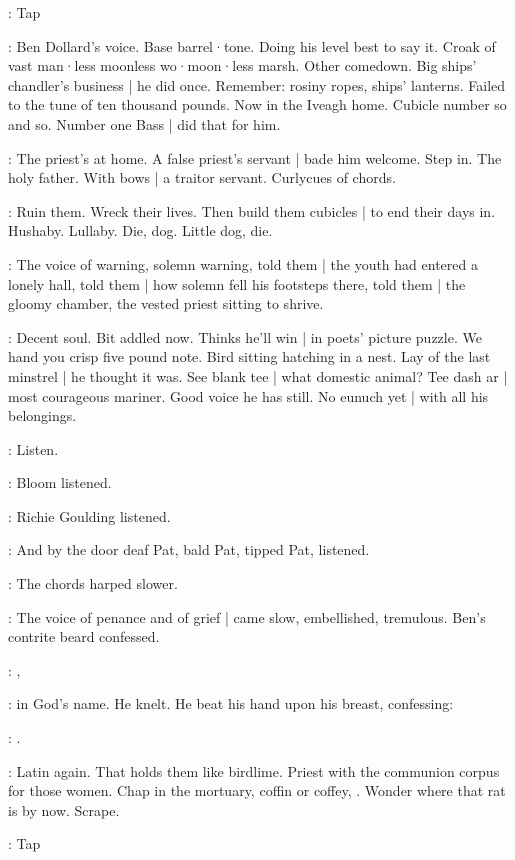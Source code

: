 \stripling:
Tap

\BloomIntA:
Ben Dollard's voice.
Base barrel·tone.
Doing his level best to say it.
Croak of vast man·less moonless wo·moon·less marsh.
Other comedown.
Big ships' chandler's business |
he did once.
Remember:
rosiny ropes,
ships' lanterns.
Failed to the tune of ten thousand pounds.
Now in the Iveagh home.
Cubicle number so and so.
Number one Bass |
did that for him.

:
The priest's at home.
A false priest's servant |
bade him welcome.
Step in.
The holy father.
With bows |
a traitor servant.
Curlycues of chords.

\BloomIntB:
Ruin them.
Wreck their lives.
Then build them cubicles |
to end their days in.
Hushaby.
Lullaby.
Die,
dog.
Little dog,
die.

:
The voice of warning,
solemn warning,
told them |
the youth had entered a lonely hall,
told them |
how solemn fell his footsteps there,
told them |
the gloomy chamber,
the vested priest sitting to shrive.

\BloomIntB:
Decent soul.
Bit addled now.
Thinks he'll win |
in  poets' picture puzzle.
We hand you crisp five pound note.
Bird sitting hatching in a nest.
Lay of the last minstrel |
he thought it was.
See blank tee |
what domestic animal?
Tee dash ar |
most courageous mariner.
Good voice he has still.
No eunuch yet |
with all his belongings.

\BloomIntA:
Listen.

:
Bloom listened.

:
Richie Goulding listened.

:
And by the door
deaf Pat,
bald Pat,
tipped Pat,
listened.

:
The chords harped slower.

:
The voice of penance and of grief |
came slow,
embellished,
tremulous.
Ben's contrite beard confessed.

\dollard:
,

:
in God's name.
He knelt.
He beat his hand upon his breast,
confessing:

\dollard:
.

\BloomIntB:
Latin again.
That holds them like birdlime.
Priest with the communion corpus for those women.
Chap in the mortuary,
coffin or coffey,
.
Wonder where that rat is by now.
Scrape.

\stripling:
Tap

